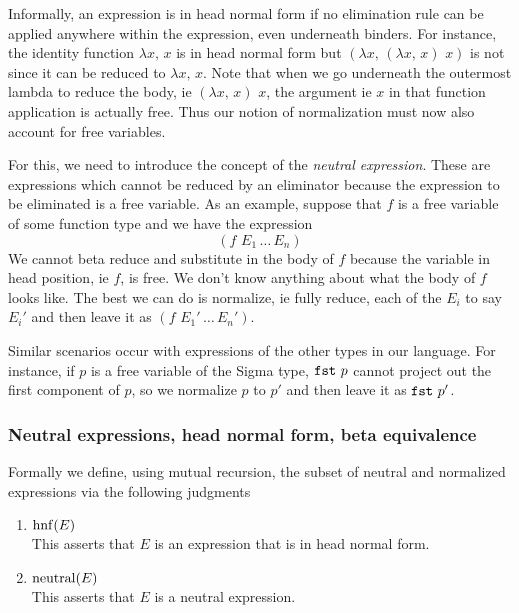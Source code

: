 \documentclass{article}
\begin{document}


Informally, an expression is in head normal form if no elimination rule can be
applied anywhere within the expression, even underneath binders.
For instance, the identity function $\lambda x, \, x$ is in head normal form
but $(\lambda x, \, (\lambda x, \, x) \,\, x)$ is not since it can be reduced to
$\lambda x, \, x$.
Note that when we go underneath the outermost lambda to reduce the body, ie
$(\lambda x, \, x) \,\, x$, the argument ie $x$ in that function application is
actually free.
Thus our notion of normalization must now also account for free variables.

For this, we need to introduce the concept of the \textit{neutral expression}.
These are expressions which cannot be reduced by an eliminator
because the expression to be eliminated is a free variable.
As an example, suppose that $f$ is a free variable of some function type and
we have the expression
\[ (f \,\, E_1 \, \dots \, E_n) \]
We cannot beta reduce and substitute in the body of $f$ because the
variable in head position, ie $f$, is free. We don't know anything about what
the body of $f$ looks like.
The best we can do is normalize, ie fully reduce, each of the $E_i$ to say $E_i'$
and then leave it as $(f \,\, E_1' \, \dots \, E_n')$.

Similar scenarios occur with expressions of the other types in our language.
For instance, if $p$ is a free variable of the Sigma type, $\texttt{fst} \,\, p$ cannot
project out the first component of $p$, so we normalize $p$ to $p'$ and then
leave it as $\texttt{fst} \,\, p'$.


\subsubsection{Neutral expressions, head normal form, beta equivalence}
Formally we define, using mutual recursion, the subset of neutral and 
normalized expressions via the following judgments
\begin{enumerate}
  \item $\operatorname{hnf}(E)$ \\
    This asserts that $E$ is an expression that is in head normal form.
  
  \item $\operatorname{neutral}(E)$ \\
    This asserts that $E$ is a neutral expression.
\end{enumerate}
\end{document}
